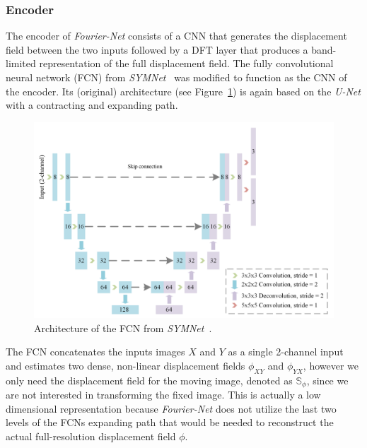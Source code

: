 \subsubsection{Encoder}	\label{SubSubSec:Encoder}
The encoder of \emph{Fourier-Net} consists of a CNN that generates the displacement field between the two inputs followed by a DFT layer that produces a band-limited representation of the full displacement field. The fully convolutional neural network (FCN) from \emph{SYMNet}~\cite{SYM-Net} was modified to function as the CNN of the encoder. Its (original) architecture (see Figure~\ref{fig:SYMNet}) is again based on the \emph{U-Net} with a contracting and expanding path. 
\begin{figure}[h] %
	\centering
	\graphicspath{{images/}{\main/images/}}
	\includegraphics[width=\linewidth]{SYMNetArchitectureFCN.png} 
	\caption{Architecture of the FCN from \emph{SYMNet}~\cite{SYM-Net}.}
	\label{fig:SYMNet}
\end{figure}
The FCN concatenates the inputs images $X$ and $Y$ as a single 2-channel input and estimates two dense, non-linear displacement fields $\phi_{XY}$ and $\phi_{YX}$, however we only need the displacement field for the moving image, denoted as $\mathbb{S}_\phi$, since we are not interested in transforming the fixed image. This is actually a low dimensional representation because \emph{Fourier-Net} does not utilize the last two levels of the FCNs expanding path that would be needed to reconstruct the actual full-resolution displacement field $\phi$.\\
